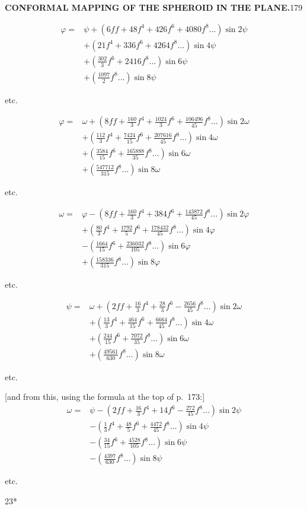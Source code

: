 \par\clearpage
\noindent\null\hfill{\small\textbf{CONFORMAL MAPPING OF THE SPHEROID IN THE PLANE.}}\hfill179\par\medskip
\[
\begin{aligned}
\varphi={}&\psi+(6ff+48f^4+426f^6+4080f^8\ldots)\sin2\psi\\
&+(21f^4+336f^6+4264f^8\ldots)\sin4\psi\\
&+(\tfrac{302}{3}f^6+2416f^8\ldots)\sin6\psi\\
&+(\tfrac{1097}{2}f^8\ldots)\sin8\psi
\end{aligned}
\]
{\centering etc.\par}
\[
\begin{aligned}
\varphi={}&\omega+(8ff+\tfrac{160}{3}f^4+\tfrac{1024}{3}f^6+\tfrac{106496}{45}f^8\ldots)\sin2\omega\\
&+(\tfrac{112}{3}f^4+\tfrac{7424}{15}f^6+\tfrac{207616}{45}f^8\ldots)\sin4\omega\\
&+(\tfrac{3584}{15}f^6+\tfrac{165888}{35}f^8\ldots)\sin6\omega\\
&+(\tfrac{547712}{315}f^8\ldots)\sin8\omega
\end{aligned}
\]
{\centering etc.\par}
\[
\begin{aligned}
\omega={}&\varphi-(8ff+\tfrac{160}{3}f^4+384f^6+\tfrac{143872}{45}f^8\ldots)\sin2\varphi\\
&+(\tfrac{80}{3}f^4+\tfrac{1792}{5}f^6+\tfrac{178432}{45}f^8\ldots)\sin4\varphi\\
&-(\tfrac{1664}{15}f^6+\tfrac{236032}{105}f^8\ldots)\sin6\varphi\\
&+(\tfrac{158336}{315}f^8\ldots)\sin8\varphi
\end{aligned}
\]
{\centering etc.\par}
\[
\begin{aligned}
\psi={}&\omega+(2ff+\tfrac{16}{3}f^4+\tfrac{28}{3}f^6-\tfrac{2656}{45}f^8\ldots)\sin2\omega\\
&+(\tfrac{13}{3}f^4+\tfrac{464}{15}f^6+\tfrac{6664}{45}f^8\ldots)\sin4\omega\\
&+(\tfrac{244}{15}f^6+\tfrac{7072}{35}f^8\ldots)\sin6\omega\\
&+(\tfrac{49561}{630}f^8\ldots)\sin8\omega
\end{aligned}
\]
{\centering etc.\par}
[and from this, using the formula at the top of p.~173:]
\[
\begin{aligned}
\omega={}&\psi-(2ff+\tfrac{16}{3}f^4+14f^6-\tfrac{272}{45}f^8\ldots)\sin2\psi\\
&-(\tfrac13f^4+\tfrac{48}{5}f^6+\tfrac{4472}{45}f^8\ldots)\sin4\psi\\
&-(\tfrac{34}{15}f^6+\tfrac{4528}{105}f^8\ldots)\sin6\psi\\
&-(\tfrac{4397}{630}f^8\ldots)\sin8\psi
\end{aligned}
\]
{\centering etc.\par}
\par\noindent\null\hfill{\small23*}\hspace*{.12\linewidth}\par

